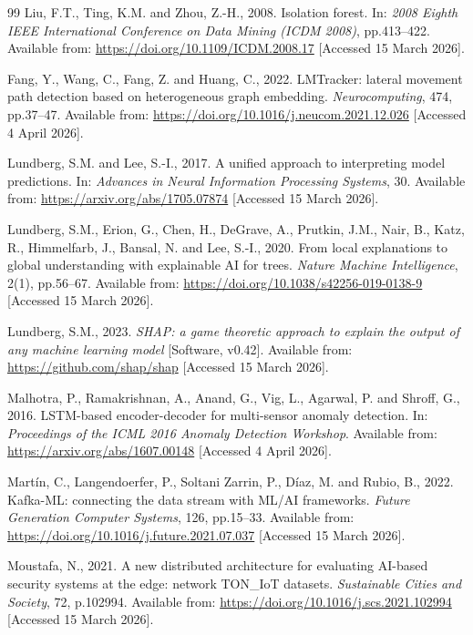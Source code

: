 \documentclass[12pt,a4paper]{report}
\begin{document}
\begin{thebibliography}{99}
Liu, F.T., Ting, K.M. and Zhou, Z.-H., 2008. Isolation forest. In: \textit{2008 Eighth IEEE International Conference on Data Mining (ICDM 2008)}, pp.413--422. Available from: \url{https://doi.org/10.1109/ICDM.2008.17} [Accessed 15 March 2026].

Fang, Y., Wang, C., Fang, Z. and Huang, C., 2022. LMTracker: lateral movement path detection based on heterogeneous graph embedding. \textit{Neurocomputing}, 474, pp.37--47. Available from: \url{https://doi.org/10.1016/j.neucom.2021.12.026} [Accessed 4 April 2026].

Lundberg, S.M. and Lee, S.-I., 2017. A unified approach to interpreting model predictions. In: \textit{Advances in Neural Information Processing Systems}, 30. Available from: \url{https://arxiv.org/abs/1705.07874} [Accessed 15 March 2026].

Lundberg, S.M., Erion, G., Chen, H., DeGrave, A., Prutkin, J.M., Nair, B., Katz, R., Himmelfarb, J., Bansal, N. and Lee, S.-I., 2020. From local explanations to global understanding with explainable AI for trees. \textit{Nature Machine Intelligence}, 2(1), pp.56--67. Available from: \url{https://doi.org/10.1038/s42256-019-0138-9} [Accessed 15 March 2026].

Lundberg, S.M., 2023. \textit{SHAP: a game theoretic approach to explain the output of any machine learning model} [Software, v0.42]. Available from: \url{https://github.com/shap/shap} [Accessed 15 March 2026].

Malhotra, P., Ramakrishnan, A., Anand, G., Vig, L., Agarwal, P. and Shroff, G., 2016. LSTM-based encoder-decoder for multi-sensor anomaly detection. In: \textit{Proceedings of the ICML 2016 Anomaly Detection Workshop}. Available from: \url{https://arxiv.org/abs/1607.00148} [Accessed 4 April 2026].

Mart\'{i}n, C., Langendoerfer, P., Soltani Zarrin, P., D\'{i}az, M. and Rubio, B., 2022. Kafka-ML: connecting the data stream with ML/AI frameworks. \textit{Future Generation Computer Systems}, 126, pp.15--33. Available from: \url{https://doi.org/10.1016/j.future.2021.07.037} [Accessed 15 March 2026].

Moustafa, N., 2021. A new distributed architecture for evaluating AI-based security systems at the edge: network TON\_IoT datasets. \textit{Sustainable Cities and Society}, 72, p.102994. Available from: \url{https://doi.org/10.1016/j.scs.2021.102994} [Accessed 15 March 2026].


\end{thebibliography}
\end{document}
